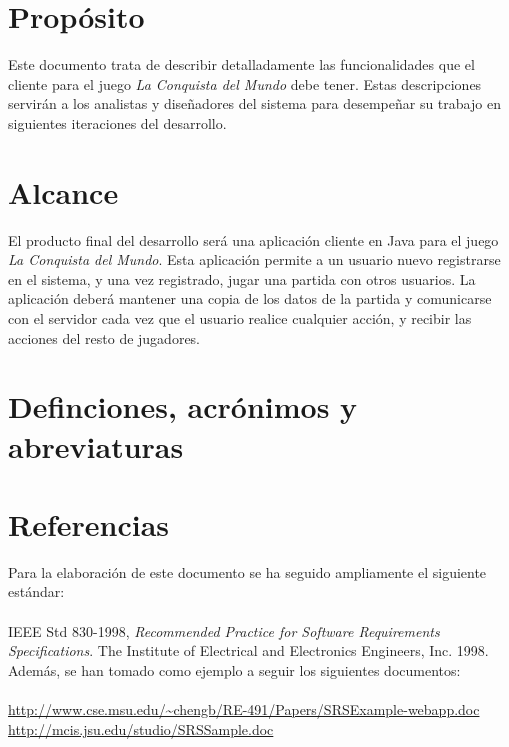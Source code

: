\section{Propósito}

Este documento trata de describir detalladamente las funcionalidades que el
cliente para el juego \textit{La Conquista del Mundo} debe tener. Estas
descripciones servirán a los analistas y diseñadores del sistema para
desempeñar su trabajo en siguientes iteraciones del desarrollo.

\section{Alcance}

El producto final del desarrollo será una aplicación cliente en Java para el
juego \textit{La Conquista del Mundo}. Esta aplicación permite a un usuario
nuevo registrarse en el sistema, y una vez registrado, jugar una partida con
otros usuarios. La aplicación deberá mantener una copia de los datos de la
partida y comunicarse con el servidor cada vez que el usuario realice cualquier
acción, y recibir las acciones del resto de jugadores.

\section{Definciones, acrónimos y abreviaturas}


\section{Referencias}

Para la elaboración de este documento se ha seguido ampliamente el siguiente
estándar:\\
\\
IEEE Std 830-1998, \textit{Recommended Practice for Software Requirements
Specifications}.
The Institute of Electrical and Electronics Engineers, Inc. 1998.\\

Además, se han tomado como ejemplo a seguir los siguientes documentos:\\
\\
{\small
\url{http://www.cse.msu.edu/~chengb/RE-491/Papers/SRSExample-webapp.doc}\\
\url{http://mcis.jsu.edu/studio/SRSSample.doc}\\
}\\

